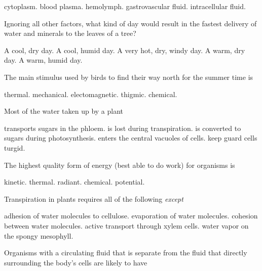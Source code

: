 \begin{choices}
\choice cytoplasm. 
\choice blood plasma. 
\correctchoice hemolymph. 
\choice gastrovascular fluid. 
\choice intracellular fluid. 
\end{choices}

\question
Ignoring all other factors, what kind of day would result in the fastest delivery of water and minerals to the leaves of a tree?

\begin{choices}
\choice A cool, dry day. 
\choice A cool, humid day. 
\choice A very hot, dry, windy day. 
\correctchoice A warm, dry day. 
\choice A warm, humid day.  
\end{choices}

\question
The main stimulus used by birds to find their way north for the summer time is 

\begin{choices}
\choice thermal. 
\choice mechanical. 
\correctchoice electomagnetic.
\choice thigmic. 
\choice chemical. 
\end{choices}

\question
Most of the water taken up by a plant

\begin{choices}
\choice transports sugars in the phloem. 
\correctchoice is lost during transpiration. 
\choice is converted to sugars during photosynthesis. 
\choice enters the central vacuoles of cells.  
\choice keep guard cells turgid. 
\end{choices}

\question
The highest quality form of energy (best able to do work) for organisms is

\begin{choices}
\choice kinetic. 
\choice thermal. 
\correctchoice radiant. 
\choice chemical.
\choice potential.
\end{choices}

\question
Transpiration in plants requires all of the following \emph{except}

\begin{choices}
\choice adhesion of water molecules to cellulose. 
\choice evaporation of water molecules. 
\choice cohesion between water molecules.  
\correctchoice active transport through xylem cells. 
\choice water vapor on the spongy mesophyll. 
\end{choices}

\question
Organisms with a circulating fluid that is separate from the fluid that directly surrounding the body's cells are likely to have

